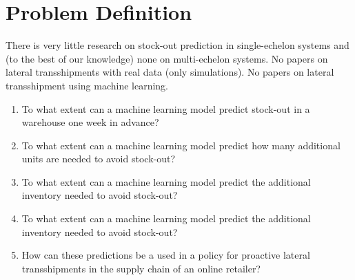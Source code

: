 \documentclass[../../main.tex]{subfiles}
\begin{document}
\section{Problem Definition}

There is very little research on stock-out prediction in single-echelon systems and (to the best of our knowledge) none on multi-echelon systems. No papers on lateral transshipments with real data (only simulations). No papers on lateral transshipment using machine learning.

\begin{enumerate}
\item To what extent can a machine learning model predict stock-out in a warehouse one week in advance?
\item To what extent can a machine learning model predict how many additional units are needed to avoid stock-out?
\item To what extent can a machine learning model predict the additional inventory needed to avoid stock-out?
\item To what extent can a machine learning model predict the additional inventory needed to avoid stock-out?
\item How can these predictions be a used in a policy for proactive lateral transshipments in the supply chain of an online retailer?
\end{enumerate}


\end{document}
